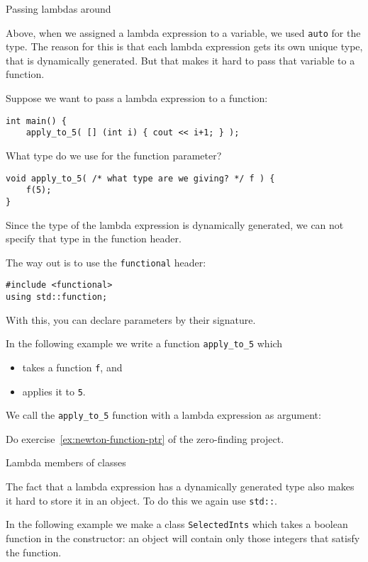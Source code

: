  {Passing lambdas around}
\label{sec:lambdaauto}

Above, when we assigned a lambda expression to a variable,
we used \lstinline{auto} for the type.
The reason for this is that each lambda expression gets its own
unique type, that is dynamically generated.
But that makes it hard to pass that variable to a function.

Suppose we want to pass a lambda expression to a function:
\begin{lstlisting}
int main() {
    apply_to_5( [] (int i) { cout << i+1; } );
\end{lstlisting}
What type do we use for the function parameter?
\begin{lstlisting}
void apply_to_5( /* what type are we giving? */ f ) {
    f(5);
}
\end{lstlisting}
Since the type of the lambda expression is dynamically generated,
we can not specify that type in the function header.

The way out is to use the \lstinline{functional} header:
\begin{lstlisting}
#include <functional>
using std::function;
\end{lstlisting}
With this, you can declare parameters by their signature.

In the following example we write a function \lstinline{apply_to_5}
which 
\begin{itemize}
\item takes a function \lstinline{f}, and
\item applies it to \lstinline{5}.
\end{itemize}
We call the \lstinline{apply_to_5} function
with a lambda expression as argument:


\begin{exercise}
  Do exercise~\ref{ex:newton-function-ptr} of the zero-finding project.
\end{exercise}

 {Lambda members of classes}

The fact that a lambda expression has a dynamically generated type
also makes it hard to store it in an object.
To do this we again use \lstinline{std::}.

In the following example we make a class \lstinline{SelectedInts}
which takes a boolean function in the constructor:
an object will contain only those integers that satisfy the function.

